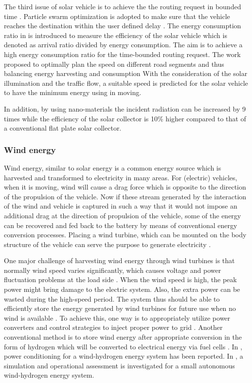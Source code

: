 The third issue of solar vehicle is to achieve the the routing request in bounded time \cite{JX_chen2013green,JX_aqeel2016optimized,JX_elizabeth2016velocity,JX_lv2016speed}.
Particle swarm optimization is adopted to make sure that the vehicle reaches the destination within the user defined delay \cite{JX_chen2013green}.
The energy consumption ratio in \cite{JX_aqeel2016optimized} is introduced to measure the efficiency of the solar vehicle which is denoted as arrival ratio divided by energy consumption. The aim is to achieve a high energy consumption ratio for the time-bounded routing request.
The work \cite{JX_elizabeth2016velocity} proposed to optimally plan the speed on different road segments and thus balancing energy harvesting and consumption
With the consideration of the solar illumination and the traffic flow, a suitable speed is predicted for the solar vehicle to have the minimum energy using in moving.

In addition, by using nano-materials the incident radiation can be increased by 9 times \cite{JX_abdin2013solar} while the efficiency of the solar collector is 10\% higher compared to that of a conventional flat plate solar collector.

\subsubsection{Wind energy}

Wind energy, similar to solar energy is a common energy source which is harvested and transformed to electricity in many areas.
For (electric) vehicles, when it is moving, wind will cause a drag force which is opposite to the direction of the propulsion of the vehicle.
Now if these stream generated by the interaction of the wind and vehicle is captured in such a way that it would not impose an additional drag at the direction of propulsion of the vehicle, some of the energy can be recovered and fed back to the battery by means of conventional energy conversion processes.
Placing a wind turbine, which can be mounted on the body structure of the vehicle can serve the purpose to generate electricity \cite{JX_Moshfegh,JX_7006196}.

One major challenge of harvesting wind energy through wind turbines is that normally wind speed varies significantly, which causes voltage and power fluctuation problems at the load side \cite{JX_6183172}.
When the wind speed is high, the peak power might bring damage to the electric system.
Also, the extra power can be wasted during the high-speed period.
The system thus should be able to efficiently store the energy generated by wind turbines for future use when no wind is available \cite{JX_KHAN2005421}.
To achieve this, one way is to appropriately utilize power converters and control strategies to inject proper power to grid \cite{JX_8077284,JX_7925346,JX_1304613}.
Another conventional method is to store wind energy after appropriate conversion in the form of hydrogen which will be converted to electrical energy via fuel cells \cite{JX_ONAR2006707}.
In \cite{JX_DEBATTISTA2006478}, power conditioning for a wind-hydrogen energy system has been reported.
In \cite{JX_BECHRAKIS200646}, a simulation and operational assessment is investigated for a small autonomous wind-hydrogen energy system.

